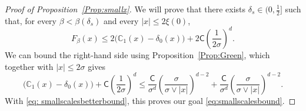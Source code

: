 \documentclass[11pt,a4paper]{article}
\numberwithin{equation}{section}
\theoremstyle{plain}
\theoremstyle{definition}
\newcommand\1{\mathds{1}}
\newcommand\CGreen{\mathsf{C}}
\begin{document}
\begin{proof}[Proof of Proposition~\textup{\ref{Prop:smallx}}] We will prove that there exists $\delta_s\in (0,\tfrac{1}{2}]$ such that, for every $\beta<\beta(\delta_s)$ and every $|x| \leq 2\xi(0)$,
    \begin{equation}
        F_{\beta}(x)
        \leq
        2  \big(\mathbb{C}_1(x) -\delta_{0}(x)\big) + 2 \CGreen \left(\frac{1}{2\sigma}\right)^{d}.
        \label{eq: smallscalesbetterbound}
    \end{equation}
    We can bound the right-hand side using
    Proposition~\ref{Prop:Green}, which together with $|x|\le 2\sigma$ gives
    \begin{equation}
    \big(\mathbb{C}_1(x) -\delta_{0}(x)\big)  +   \CGreen \left(\frac{1}{2\sigma}\right)^{d}
    \le
    \frac{\CGreen}{\sigma^d}  \left(\frac{\sigma}{\sigma \vee |x|}\right)^{d-2}
    +
    \frac{\CGreen}{\sigma^d}  \left(\frac{\sigma}{\sigma \vee |x|}\right)^{d-2}.
    \end{equation}
    With \eqref{eq: smallscalesbetterbound}, this proves our goal
    \eqref{eq:smallscalesbound}.


\end{proof}
\end{document}
